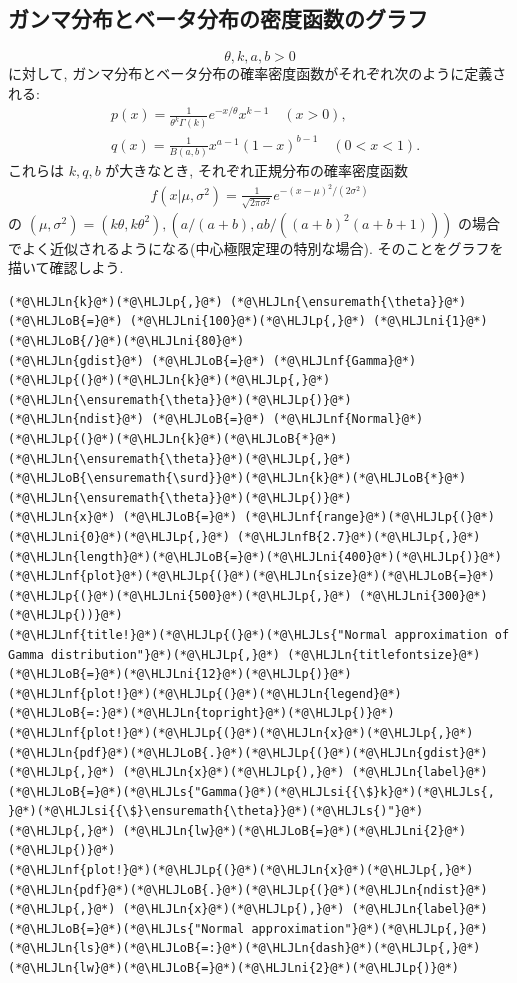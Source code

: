 \documentclass[12pt,a4paper,xelatex,ja=standard]{bxjsarticle}
\newcommand{\HLJLn}[1]{#1}
\newcommand{\HLJLnf}[1]{\textcolor[RGB]{66,102,213}{#1}}
\newcommand{\HLJLs}[1]{\textcolor[RGB]{201,61,57}{#1}}
\newcommand{\HLJLsi}[1]{#1}
\newcommand{\HLJLnfB}[1]{\textcolor[RGB]{59,151,46}{#1}}
\newcommand{\HLJLni}[1]{\textcolor[RGB]{59,151,46}{#1}}
\newcommand{\HLJLoB}[1]{\textcolor[RGB]{102,102,102}{\textbf{#1}}}
\newcommand{\HLJLp}[1]{#1}
\begin{document}
\subsection{ガンマ分布とベータ分布の密度函数のグラフ}
\[
\theta,k,a,b>0
\]
に対して, ガンマ分布とベータ分布の確率密度函数がそれぞれ次のように定義される:
\[
\begin{aligned}
&
p(x) = \frac{1}{\theta^k \Gamma(k)} e^{-x/\theta} x^{k-1} \quad (x>0),
\\ &
q(x) = \frac{1}{B(a,b)} x^{a-1}(1-x)^{b-1} \quad (0 < x < 1).
\end{aligned}
\]
これらは $k,q,b$ が大きなとき, それぞれ正規分布の確率密度函数
\[
\begin{aligned}
f(x|\mu,\sigma^2) = \frac{1}{\sqrt{2\pi\sigma^2}}e^{-(x-\mu)^2/(2\sigma^2)}
\end{aligned}
\]
の $(\mu,\sigma^2)=(k\theta, k\theta^2), (a/(a+b), ab/((a+b)^2(a+b+1)))$ の場合でよく近似されるようになる(中心極限定理の特別な場合). そのことをグラフを描いて確認しよう.


\begin{lstlisting}
(*@\HLJLn{k}@*)(*@\HLJLp{,}@*) (*@\HLJLn{\ensuremath{\theta}}@*) (*@\HLJLoB{=}@*) (*@\HLJLni{100}@*)(*@\HLJLp{,}@*) (*@\HLJLni{1}@*)(*@\HLJLoB{/}@*)(*@\HLJLni{80}@*)
(*@\HLJLn{gdist}@*) (*@\HLJLoB{=}@*) (*@\HLJLnf{Gamma}@*)(*@\HLJLp{(}@*)(*@\HLJLn{k}@*)(*@\HLJLp{,}@*) (*@\HLJLn{\ensuremath{\theta}}@*)(*@\HLJLp{)}@*)
(*@\HLJLn{ndist}@*) (*@\HLJLoB{=}@*) (*@\HLJLnf{Normal}@*)(*@\HLJLp{(}@*)(*@\HLJLn{k}@*)(*@\HLJLoB{*}@*)(*@\HLJLn{\ensuremath{\theta}}@*)(*@\HLJLp{,}@*) (*@\HLJLoB{\ensuremath{\surd}}@*)(*@\HLJLn{k}@*)(*@\HLJLoB{*}@*)(*@\HLJLn{\ensuremath{\theta}}@*)(*@\HLJLp{)}@*)
(*@\HLJLn{x}@*) (*@\HLJLoB{=}@*) (*@\HLJLnf{range}@*)(*@\HLJLp{(}@*)(*@\HLJLni{0}@*)(*@\HLJLp{,}@*) (*@\HLJLnfB{2.7}@*)(*@\HLJLp{,}@*) (*@\HLJLn{length}@*)(*@\HLJLoB{=}@*)(*@\HLJLni{400}@*)(*@\HLJLp{)}@*)
(*@\HLJLnf{plot}@*)(*@\HLJLp{(}@*)(*@\HLJLn{size}@*)(*@\HLJLoB{=}@*)(*@\HLJLp{(}@*)(*@\HLJLni{500}@*)(*@\HLJLp{,}@*) (*@\HLJLni{300}@*)(*@\HLJLp{))}@*)
(*@\HLJLnf{title!}@*)(*@\HLJLp{(}@*)(*@\HLJLs{"Normal approximation of Gamma distribution"}@*)(*@\HLJLp{,}@*) (*@\HLJLn{titlefontsize}@*)(*@\HLJLoB{=}@*)(*@\HLJLni{12}@*)(*@\HLJLp{)}@*)
(*@\HLJLnf{plot!}@*)(*@\HLJLp{(}@*)(*@\HLJLn{legend}@*)(*@\HLJLoB{=:}@*)(*@\HLJLn{topright}@*)(*@\HLJLp{)}@*)
(*@\HLJLnf{plot!}@*)(*@\HLJLp{(}@*)(*@\HLJLn{x}@*)(*@\HLJLp{,}@*) (*@\HLJLn{pdf}@*)(*@\HLJLoB{.}@*)(*@\HLJLp{(}@*)(*@\HLJLn{gdist}@*)(*@\HLJLp{,}@*) (*@\HLJLn{x}@*)(*@\HLJLp{),}@*) (*@\HLJLn{label}@*)(*@\HLJLoB{=}@*)(*@\HLJLs{"Gamma(}@*)(*@\HLJLsi{{\$}k}@*)(*@\HLJLs{, }@*)(*@\HLJLsi{{\$}\ensuremath{\theta}}@*)(*@\HLJLs{)"}@*)(*@\HLJLp{,}@*) (*@\HLJLn{lw}@*)(*@\HLJLoB{=}@*)(*@\HLJLni{2}@*)(*@\HLJLp{)}@*)
(*@\HLJLnf{plot!}@*)(*@\HLJLp{(}@*)(*@\HLJLn{x}@*)(*@\HLJLp{,}@*) (*@\HLJLn{pdf}@*)(*@\HLJLoB{.}@*)(*@\HLJLp{(}@*)(*@\HLJLn{ndist}@*)(*@\HLJLp{,}@*) (*@\HLJLn{x}@*)(*@\HLJLp{),}@*) (*@\HLJLn{label}@*)(*@\HLJLoB{=}@*)(*@\HLJLs{"Normal approximation"}@*)(*@\HLJLp{,}@*) (*@\HLJLn{ls}@*)(*@\HLJLoB{=:}@*)(*@\HLJLn{dash}@*)(*@\HLJLp{,}@*) (*@\HLJLn{lw}@*)(*@\HLJLoB{=}@*)(*@\HLJLni{2}@*)(*@\HLJLp{)}@*)
\end{lstlisting}
\end{document}
